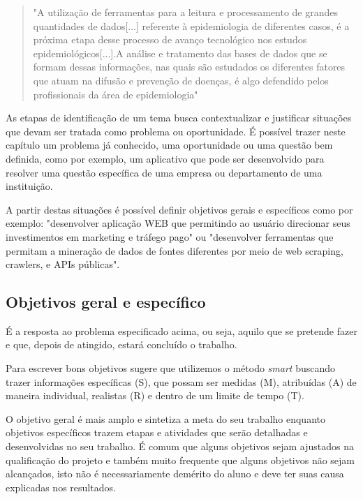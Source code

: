\begin{quote}
    "A utilização de ferramentas para a leitura e processamento de grandes quantidades de dados[...] referente à epidemiologia de diferentes casos, é a próxima etapa desse processo de avanço tecnológico nos estudos epidemiológicos[...].A análise e tratamento das bases de dados que se formam dessas informações, nas quais são estudados os diferentes fatores que atuam na difusão e prevenção de doenças, é algo defendido pelos profissionais da área de epidemiologia" \cite{paulosilva}
    \end{quote}

As etapas de identificação de um tema busca contextualizar e justificar situações que devam ser tratada como problema ou oportunidade.  É possível  trazer neste capítulo um problema já conhecido, uma oportunidade ou uma questão bem definida, como por exemplo, um aplicativo que pode ser desenvolvido para resolver uma questão específica de uma empresa ou departamento de uma instituição.

A partir destas situações é possível definir  objetivos gerais e específicos como por exemplo: "desenvolver aplicação WEB que permitindo ao usuário direcionar seus investimentos em marketing e tráfego pago" ou "desenvolver ferramentas que permitam a mineração de dados de fontes diferentes por meio de web scraping, crawlers, e APIs públicas". 


\subsection{Objetivos geral e específico}

É a resposta ao problema especificado acima, ou seja, aquilo que se pretende fazer e que, depois de atingido, estará concluído o trabalho.

Para escrever bons objetivos \cite{doran} sugere que utilizemos o método \textit{\ac{smart}} buscando trazer informações específicas (S), que possam ser medidas (M), atribuídas (A) de maneira individual, realistas (R) e dentro de um limite de tempo (T).

O objetivo geral é mais amplo e sintetiza a meta do seu trabalho enquanto objetivos específicos trazem etapas e atividades que serão detalhadas e desenvolvidas no seu trabalho. É comum que alguns objetivos sejam ajustados na qualificação do projeto e também muito frequente que alguns objetivos não sejam alcançados, isto não é necessariamente demérito do aluno e deve ter suas causa explicadas nos resultados.       

